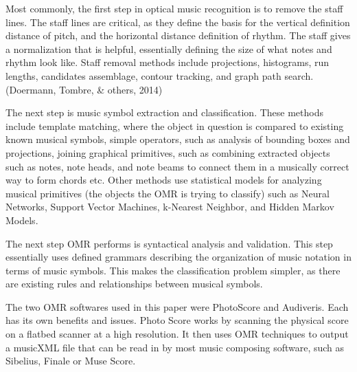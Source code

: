 \documentclass[12pt,twoside]{reedthesis}
\theoremstyle{definition}
\theoremstyle{definition}
\theoremstyle{definition}
\theoremstyle{remark}
\begin{document}
Most commonly, the first step in optical music recognition is to remove
the staff lines. The staff lines are critical, as they define the basis
for the vertical definition distance of pitch, and the horizontal
distance definition of rhythm. The staff gives a normalization that is
helpful, essentially defining the size of what notes and rhythm look
like. Staff removal methods include projections, histograms, run
lengths, candidates assemblage, contour tracking, and graph path search.
(Doermann, Tombre, \& others, 2014)

The next step is music symbol extraction and classification. These
methods include template matching, where the object in question is
compared to existing known musical symbols, simple operators, such as
analysis of bounding boxes and projections, joining graphical
primitives, such as combining extracted objects such as notes, note
heads, and note beams to connect them in a musically correct way to form
chords etc. Other methods use statistical models for analyzing musical
primitives (the objects the OMR is trying to classify) such as Neural
Networks, Support Vector Machines, k-Nearest Neighbor, and Hidden Markov
Models.

The next step OMR performs is syntactical analysis and validation. This
step essentially uses defined grammars describing the organization of
music notation in terms of music symbols. This makes the classification
problem simpler, as there are existing rules and relationships between
musical symbols.

The two OMR softwares used in this paper were PhotoScore and Audiveris.
Each has its own benefits and issues. Photo Score works by scanning the
physical score on a flatbed scanner at a high resolution. It then uses
OMR techniques to output a musicXML file that can be read in by most
music composing software, such as Sibelius, Finale or Muse Score.
\end{document}
